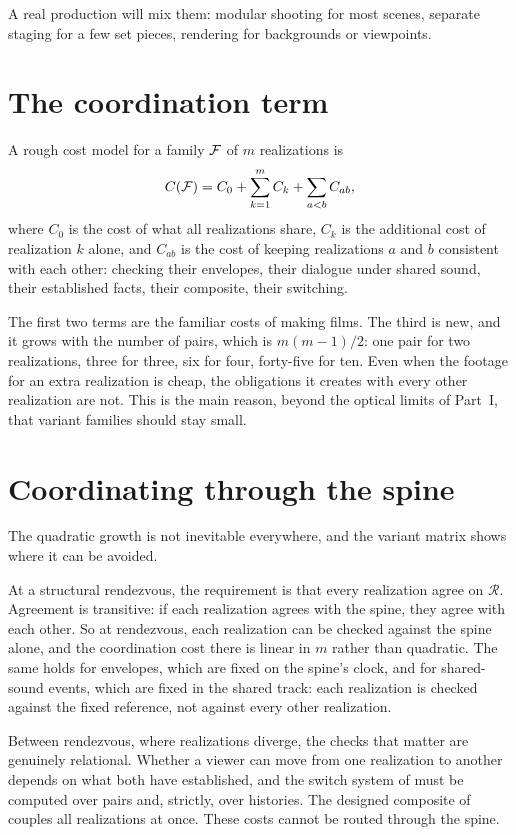A real production will mix them: modular shooting for most scenes, separate staging for a few set pieces, rendering for backgrounds or viewpoints.

\section{The coordination term}

A rough cost model for a family $\mathcal{F}$ of $m$ realizations is
\begin{equation}
C(\mathcal{F})=C_0+\sum_{k=1}^{m}C_k+\sum_{a<b}C_{ab},
\end{equation}
where $C_0$ is the cost of what all realizations share, $C_k$ is the additional cost of realization $k$ alone, and $C_{ab}$ is the cost of keeping realizations $a$ and $b$ consistent with each other: checking their envelopes, their dialogue under shared sound, their established facts, their composite, their switching.

The first two terms are the familiar costs of making films. The third is new, and it grows with the number of pairs, which is $m(m-1)/2$: one pair for two realizations, three for three, six for four, forty-five for ten. Even when the footage for an extra realization is cheap, the obligations it creates with every other realization are not. This is the main reason, beyond the optical limits of Part~I, that variant families should stay small.

\section{Coordinating through the spine}

The quadratic growth is not inevitable everywhere, and the variant matrix shows where it can be avoided.

At a structural rendezvous, the requirement is that every realization agree on $\mathcal R$. Agreement is transitive: if each realization agrees with the spine, they agree with each other. So at rendezvous, each realization can be checked against the spine alone, and the coordination cost there is linear in $m$ rather than quadratic. The same holds for envelopes, which are fixed on the spine's clock, and for shared-sound events, which are fixed in the shared track: each realization is checked against the fixed reference, not against every other realization.

Between rendezvous, where realizations diverge, the checks that matter are genuinely relational. Whether a viewer can move from one realization to another depends on what both have established, and the switch system of  must be computed over pairs and, strictly, over histories. The designed composite of  couples all realizations at once. These costs cannot be routed through the spine.

